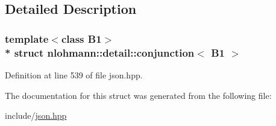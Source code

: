 \subsection{Detailed Description}
\subsubsection*{template$<$class B1$>$\\*
struct nlohmann\+::detail\+::conjunction$<$ B1 $>$}



Definition at line 539 of file json.\+hpp.



The documentation for this struct was generated from the following file\+:\begin{DoxyCompactItemize}
\item 
include/\hyperlink{json_8hpp}{json.\+hpp}\end{DoxyCompactItemize}
